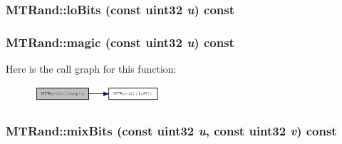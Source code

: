 \label{classMTRand_a6f5a4a532e1c3acd42052046594205be}
\hypertarget{classMTRand_ad846f81f7abfc1b20c51d1563b8e5d45}{
\subsubsection[{loBits}]{ MTRand::loBits (const {\bf uint32} {\em u}) const}}
\label{classMTRand_ad846f81f7abfc1b20c51d1563b8e5d45}
\hypertarget{classMTRand_a8539a48116c85704c5101981cb0823e7}{
\subsubsection[{magic}]{ MTRand::magic (const {\bf uint32} {\em u}) const}}
\label{classMTRand_a8539a48116c85704c5101981cb0823e7}


Here is the call graph for this function:\nopagebreak
\begin{figure}[H]
\begin{center}
\leavevmode
\includegraphics[width=132pt]{classMTRand_a8539a48116c85704c5101981cb0823e7_cgraph}
\end{center}
\end{figure}
\hypertarget{classMTRand_abdd5587252ed1ac89cb274e4bf4881da}{
\subsubsection[{mixBits}]{ MTRand::mixBits (const {\bf uint32} {\em u}, \/  const {\bf uint32} {\em v}) const}}
\label{classMTRand_abdd5587252ed1ac89cb274e4bf4881da}


